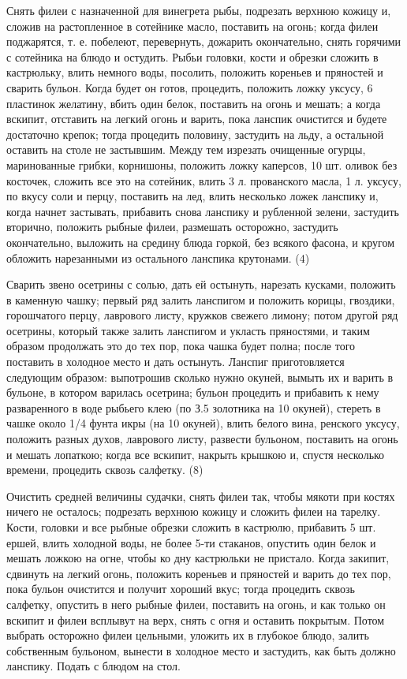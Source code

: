 Снять филеи с назначенной для винегрета рыбы, подрезать верхнюю кожицу и, сложив на растопленное в сотейнике масло, поставить на огонь; когда филеи поджарятся, т. е. побелеют, перевернуть, дожарить окончательно, снять горячими с сотейника на блюдо и остудить. Рыбьи головки, кости и обрезки сложить в кастрюльку, влить немного воды, посолить, положить кореньев и пряностей и сварить бульон. Когда будет он готов, процедить, положить ложку уксусу, 6 пластинок желатину, вбить один белок, поставить на огонь и мешать; а когда вскипит, отставить на легкий огонь и варить, пока ланспик очистится и будете достаточно крепок; тогда процедить половину, застудить на льду, а остальной оставить на столе не застывшим. Между тем изрезать очищенные огурцы, маринованные грибки, корнишоны, положить ложку каперсов, 10 шт. оливок без косточек, сложить все это на сотейник, влить 3 л. прованского масла, 1 л. уксусу, по вкусу соли и перцу, поставить на лед, влить несколько ложек ланспику и, когда начнет застывать, прибавить снова ланспику и рубленной зелени, застудить вторично, положить рыбные филеи, размешать осторожно, застудить окончательно, выложить на средину блюда горкой, без всякого фасона, и кругом обложить нарезанными из остального ланспика крутонами. (4)


Сварить звено осетрины с солью, дать ей остынуть, нарезать кусками, положить в каменную чашку; первый ряд залить ланспигом и положить корицы, гвоздики, горошчатого перцу, лаврового листу, кружков свежего лимону; потом другой ряд осетрины, который также залить ланспигом и укласть пряностями, и таким образом продолжать это до тех пор, пока чашка будет полна; после того поставить в холодное место и дать остынуть. Ланспиг приготовляется следующим образом: выпотрошив сколько нужно окуней, вымыть их и варить в бульоне, в котором варилась осетрина; бульон процедить и прибавить к нему разваренного в воде рыбьего клею (по З.5 золотника на 10 окуней), стереть в чашке около 1/4 фунта икры (на 10 окуней), влить белого вина, ренского уксусу, положить разных духов, лаврового листу, развести бульоном, поставить на огонь и мешать лопаткою; когда все вскипит, накрыть крышкою и, спустя несколько времени, процедить сквозь салфетку. (8)


Очистить средней величины судачки, снять филеи так, чтобы мякоти при костях ничего не осталось; подрезать верхнюю кожицу и сложить филеи на тарелку. Кости, головки и все рыбные обрезки сложить в кастрюлю, прибавить 5 шт. ершей, влить холодной воды, не более 5-ти стаканов, опустить один белок и мешать ложкою на огне, чтобы ко дну кастрюльки не пристало. Когда закипит, сдвинуть на легкий огонь, положить кореньев и пряностей и варить до тех пор, пока бульон очистится и получит хороший вкус; тогда процедить сквозь салфетку, опустить в него рыбные филеи, поставить на огонь, и как только он вскипит и филеи всплывут на верх, снять с огня и оставить покрытым. Потом выбрать осторожно филеи цельными, уложить их в глубокое блюдо, залить собственным бульоном, вынести в холодное место и застудить, как быть должно ланспику. Подать с блюдом на стол.

